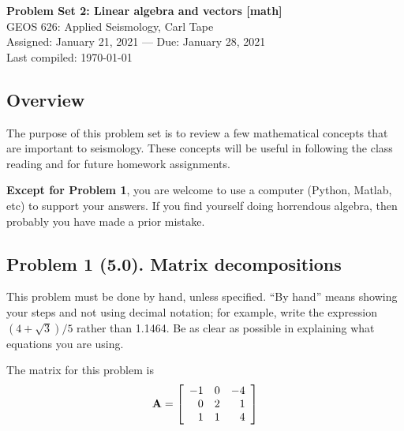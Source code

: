 \documentclass[11pt,titlepage,fleqn]{article}
\begin{document}

\begin{spacing}{1.2}
\centering
{\large \bf Problem Set 2: Linear algebra and vectors [math]} \\
GEOS 626: Applied Seismology, Carl Tape \\
Assigned: January 21, 2021 --- Due: January 28, 2021 \\
Last compiled: \today \\
\end{spacing}


\subsection*{Overview}

The purpose of this problem set is to review a few mathematical concepts that are important to seismology. These concepts will be useful in following the class reading \citep{SteinWysession,ShearerE2} and for future homework assignments.

{\bf Except for Problem 1}, you are welcome to use a computer (Python, Matlab, etc) to support your answers. If you find yourself doing horrendous algebra, then probably you have made a prior mistake.


\subsection*{Problem 1 (5.0). Matrix decompositions}

This problem must be done by hand, unless specified. ``By hand'' means showing your steps and not using decimal notation; for example, write the expression $(4 +\sqrt{3})/5$ rather than 1.1464.
Be as clear as possible in explaining what equations you are using.

\medskip\noindent
The matrix for this problem is
%
\begin{equation*}
\mbox{${\bf A}$} =  \left[ \begin{array}{rrr}
    -1  &   0  &  -4 \\
     0  &   2  &   1 \\
     1  &   1  &   4 \\
\end{array} \right]
\end{equation*}
\end{document}
